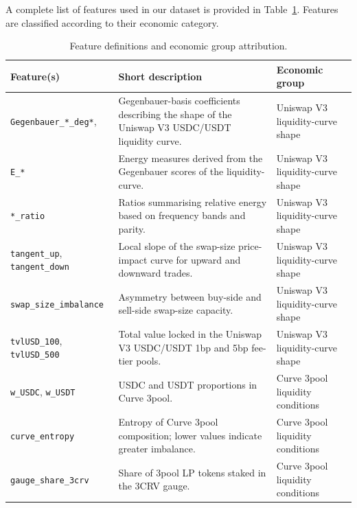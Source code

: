 \documentclass[a4paper,fleqn]{cas-sc}
\begin{document}
A complete list of features used in our dataset is provided in Table~\ref{tab:shap_feature_definitions}. Features are classified according to their economic category.
\clearpage
\begin{longtable}{p{} p{} p{}}
\caption{Feature definitions and economic group attribution.}
\label{tab:shap_feature_definitions} \\

\toprule
\textbf{Feature(s)} & \textbf{Short description} & \textbf{Economic group} \\
\midrule
\endhead

\bottomrule
\endfoot

\texttt{Gegenbauer\_*\_deg*},  
& Gegenbauer-basis coefficients describing the shape of the Uniswap V3 USDC/USDT liquidity curve. 
& Uniswap V3 liquidity-curve shape \\

\texttt{E\_*} 
& Energy measures derived from the Gegenbauer scores of the liquidity-curve. 
& Uniswap V3 liquidity-curve shape \\

\texttt{*\_ratio} 
& Ratios summarising relative energy based on frequency bands and parity. 
& Uniswap V3 liquidity-curve shape \\

\texttt{tangent\_up}, \texttt{tangent\_down} 
& Local slope of the swap-size price-impact curve for upward and downward trades. 
& Uniswap V3 liquidity-curve shape \\

\texttt{swap\_size\_imbalance} 
& Asymmetry between buy-side and sell-side swap-size capacity. 
& Uniswap V3 liquidity-curve shape \\

\texttt{tvlUSD\_100}, \texttt{tvlUSD\_500} 
& Total value locked in the Uniswap V3 USDC/USDT 1bp and 5bp fee-tier pools. 
& Uniswap V3 liquidity-curve shape \\

\midrule

\texttt{w\_USDC}, \texttt{w\_USDT} 
& USDC and USDT proportions in Curve 3pool. 
& Curve 3pool liquidity conditions \\

\texttt{curve\_entropy} 
& Entropy of Curve 3pool composition; lower values indicate greater imbalance. 
& Curve 3pool liquidity conditions \\

\texttt{gauge\_share\_3crv} 
& Share of 3pool LP tokens staked in the 3CRV gauge. 
& Curve 3pool liquidity conditions \\


\end{longtable}
\end{document}
